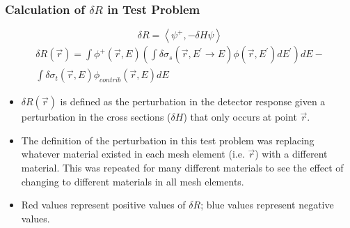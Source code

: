 \documentclass[t]{beamer}
\begin{document}
\begin{frame}
  \frametitle{Calculation of $\delta R$ in Test Problem}
  \vskip-0.25in
  \begin{equation*}
    \delta R = \left<\psi^+,-\delta H\psi\right>
  \end{equation*}
  \begin{multline*}
    \delta R\left(\vec{r}\right) = \int\phi^+\left(\vec{r},E\right)\left(\int\delta\sigma_s\left(\vec{r},E^\prime\rightarrow E\right)\phi\left(\vec{r},E^\prime\right)dE^\prime\right)dE - \\
    \int\delta\sigma_t\left(\vec{r},E\right)\phi_{contrib}\left(\vec{r},E\right)dE
  \end{multline*}
  \vskip-0.05in
  \begin{itemize}
    \item $\delta R\left(\vec{r}\right)$ is defined as the perturbation in the
          detector response given a perturbation in the cross sections
          ($\delta H$) that only occurs at point $\vec{r}$.
    \item The definition of the perturbation in this test problem was replacing
          whatever material existed in each mesh element (i.e. $\vec{r}$) with a
          different material. This was repeated for many different materials to
          see the effect of changing to different materials in all mesh
          elements.
    \item Red values represent positive values of $\delta R$; blue values
          represent negative values.
  \end{itemize}
\end{frame}
\end{document}
